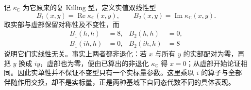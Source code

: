 \ProseParagraphBreak

记 \(\kappa_{\mathbb C}\) 为它原来的复 Killing 型，定义实值双线性型
\[
	B_1(x,y)=\operatorname{Re}\kappa_{\mathbb C}(x,y), \qquad B_2(x,y)=\operatorname{Im}\kappa_{\mathbb C}(x,y).
\]
取实部与虚部保留对称性及不变性，而
\[
	\begin{aligned}
		B_1(h,h)&=8,& B_2(h,h)&=0,\\
		B_1(ih,h)&=0,& B_2(ih,h)&=8
	\end{aligned}
\]
说明它们实线性无关。事实上两者都非退化：若 \(x\) 与所有 \(y\) 的实部配对为零，再把 \(y\) 换成 \(iy\)，虚部也为零，便由已算出的非退化 \(\kappa_{\mathbb C}\) 得 \(x=0\)；从虚部开始论证相同。因此实单性并不保证不变型只有一个实标量参数。这里乘以 \(i\) 的算子与全部伴随作用交换，却不是实标量，正是两种基域下自同态代数不同的具体表现。
